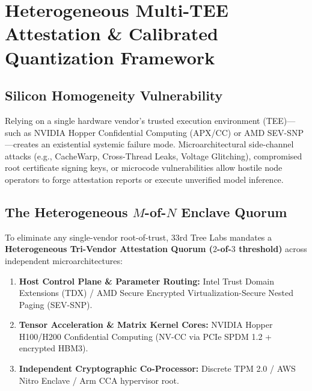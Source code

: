\documentclass[10pt,twocolumn,letterpaper]{article}
\begin{document}
\section{Heterogeneous Multi-TEE Attestation \& Calibrated Quantization Framework}

\subsection{Silicon Homogeneity Vulnerability}
Relying on a single hardware vendor's trusted execution environment (TEE)---such as NVIDIA Hopper Confidential Computing (APX/CC) or AMD SEV-SNP---creates an existential systemic failure mode. Microarchitectural side-channel attacks (e.g., CacheWarp, Cross-Thread Leaks, Voltage Glitching), compromised root certificate signing keys, or microcode vulnerabilities allow hostile node operators to forge attestation reports or execute unverified model inference.

\subsection{The Heterogeneous $M$-of-$N$ Enclave Quorum}
To eliminate any single-vendor root-of-trust, 33rd Tree Labs mandates a \textbf{Heterogeneous Tri-Vendor Attestation Quorum ($2$-of-$3$ threshold)} across independent microarchitectures:
\begin{enumerate}
    \item \textbf{Host Control Plane \& Parameter Routing:} Intel Trust Domain Extensions (TDX) / AMD Secure Encrypted Virtualization-Secure Nested Paging (SEV-SNP).
    \item \textbf{Tensor Acceleration \& Matrix Kernel Cores:} NVIDIA Hopper H100/H200 Confidential Computing (NV-CC via PCIe SPDM 1.2 + encrypted HBM3).
    \item \textbf{Independent Cryptographic Co-Processor:} Discrete TPM 2.0 / AWS Nitro Enclave / Arm CCA hypervisor root.
\end{enumerate}
\end{document}
